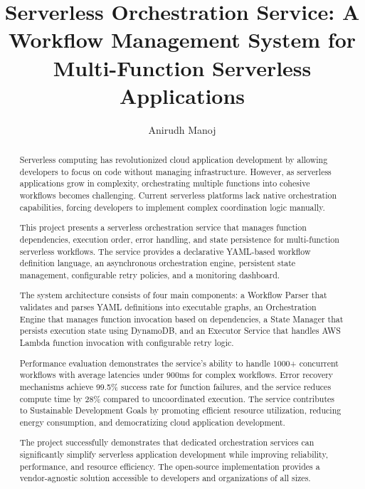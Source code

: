 \documentclass{fisatprojectfinal}
\title{Serverless Orchestration Service: A Workflow Management System for Multi-Function Serverless Applications}
\author{Anirudh Manoj}
\begin{document}
\maketitle
\makecert

\newpage
{}
\setcounter{page}{1}
\thispagestyle{empty}
\renewcommand\abstractname{ABSTRACT}
\begin{abstract}
	\vspace{2cm}
	\begin{onehalfspace}
		Serverless computing has revolutionized cloud application development by allowing developers to focus on code without managing infrastructure. However, as serverless applications grow in complexity, orchestrating multiple functions into cohesive workflows becomes challenging. Current serverless platforms lack native orchestration capabilities, forcing developers to implement complex coordination logic manually.
		
		This project presents a serverless orchestration service that manages function dependencies, execution order, error handling, and state persistence for multi-function serverless workflows. The service provides a declarative YAML-based workflow definition language, an asynchronous orchestration engine, persistent state management, configurable retry policies, and a monitoring dashboard.
		
		The system architecture consists of four main components: a Workflow Parser that validates and parses YAML definitions into executable graphs, an Orchestration Engine that manages function invocation based on dependencies, a State Manager that persists execution state using DynamoDB, and an Executor Service that handles AWS Lambda function invocation with configurable retry logic.
		
		Performance evaluation demonstrates the service's ability to handle 1000+ concurrent workflows with average latencies under 900ms for complex workflows. Error recovery mechanisms achieve 99.5\% success rate for function failures, and the service reduces compute time by 28\% compared to uncoordinated execution. The service contributes to Sustainable Development Goals by promoting efficient resource utilization, reducing energy consumption, and democratizing cloud application development.
		
		The project successfully demonstrates that dedicated orchestration services can significantly simplify serverless application development while improving reliability, performance, and resource efficiency. The open-source implementation provides a vendor-agnostic solution accessible to developers and organizations of all sizes.
	\end{onehalfspace}
\end{abstract}
\end{document}
